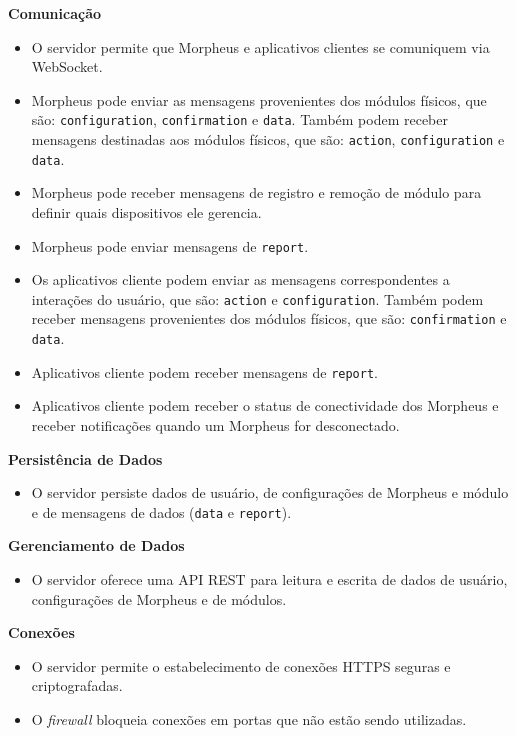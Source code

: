 \begin{description}

\item \textbf{Comunicação}

\begin{itemize}
\item O servidor permite que Morpheus e aplicativos clientes se comuniquem via WebSocket.
\item Morpheus pode enviar as mensagens provenientes dos módulos físicos, que são: \texttt{configuration}, \texttt{confirmation} e \texttt{data}. Também podem receber mensagens destinadas aos módulos físicos, que são: \texttt{action}, \texttt{configuration} e \texttt{data}.
\item Morpheus pode receber mensagens de registro e remoção de módulo para definir quais dispositivos ele gerencia.
\item Morpheus pode enviar mensagens de \texttt{report}.
\item Os aplicativos cliente podem enviar as mensagens correspondentes a interações do usuário, que são: \texttt{action} e \texttt{configuration}. Também podem receber mensagens provenientes dos módulos físicos, que são: \texttt{confirmation} e \texttt{data}.
\item Aplicativos cliente podem receber mensagens de \texttt{report}.
\item Aplicativos cliente podem receber o status de conectividade dos Morpheus e receber notificações quando um Morpheus for desconectado.
\end{itemize}

\item \textbf{Persistência de Dados}

\begin{itemize}
\item O servidor persiste dados de usuário, de configurações de Morpheus e módulo e de mensagens de dados (\texttt{data} e \texttt{report}).
\end{itemize}

\item \textbf{Gerenciamento de Dados}

\begin{itemize}
\item O servidor oferece uma API REST para leitura e escrita de dados de usuário, configurações de Morpheus e de módulos.
\end{itemize}

\item \textbf{Conexões}

\begin{itemize}
\item O servidor permite o estabelecimento de conexões HTTPS seguras e criptografadas.
\item O \emph{firewall} bloqueia conexões em portas que não estão sendo utilizadas.
\end{itemize}

\end{description}

